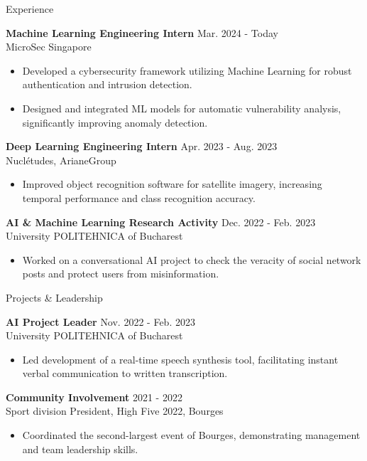 \documentclass{resume} %
\begin{document}
\begin{rSection}{Experience}

\textbf{Machine Learning Engineering Intern} \hfill {Mar. 2024 - Today} \\
MicroSec Singapore 
 \begin{itemize}
    \itemsep -3pt {} 
    \item Developed a cybersecurity framework utilizing Machine Learning for robust authentication and intrusion detection.
    \item Designed and integrated ML models for automatic vulnerability analysis, significantly improving anomaly detection.
 \end{itemize}
 
\textbf{Deep Learning Engineering Intern} \hfill {Apr. 2023 - Aug. 2023} \\
Nuclétudes, ArianeGroup 
 \begin{itemize}
    \itemsep -3pt {} 
    \item Improved object recognition software for satellite imagery, increasing temporal performance and class recognition accuracy.
 \end{itemize}
 
\textbf{AI \& Machine Learning Research Activity} \hfill {Dec. 2022 - Feb. 2023} \\
University POLITEHNICA of Bucharest 
\begin{itemize}
    \itemsep -3pt {} 
    \item Worked on a conversational AI project to check the veracity of social network posts and protect users from misinformation.
\end{itemize}

\end{rSection}


\begin{rSection}{Projects \& Leadership}

\textbf{AI Project Leader} \hfill {Nov. 2022 - Feb. 2023} \\
University POLITEHNICA of Bucharest 
\begin{itemize}
    \itemsep -3pt {} 
    \item Led development of a real-time speech synthesis tool, facilitating instant verbal communication to written transcription.
\end{itemize}

\textbf{Community Involvement} \hfill {2021 - 2022} \\
Sport division President, High Five 2022, Bourges 
\begin{itemize}
    \itemsep -3pt {} 
    \item Coordinated the second-largest event of Bourges, demonstrating management and team leadership skills.
\end{itemize}

\end{rSection}
\end{document}
